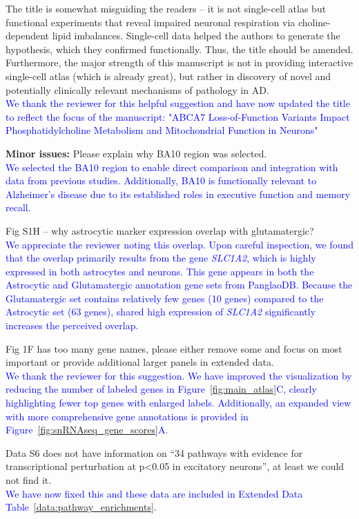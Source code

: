 The title is somewhat misguiding the readers – it is not single-cell atlas but functional experiments that reveal impaired neuronal respiration via choline-dependent lipid imbalances. Single-cell data helped the authors to generate the hypothesis, which they confirmed functionally. Thus, the title should be amended. Furthermore, the major strength of this manuscript is not in providing interactive single-cell atlas (which is already great), but rather in discovery of novel and potentially clinically relevant mechanisms of pathology in AD.\\
\textcolor{blue}{We thank the reviewer for this helpful suggestion and have now updated the title to reflect the focus of the manuscript: "ABCA7 Loss-of-Function Variants Impact Phosphatidylcholine Metabolism and Mitochondrial Function in Neurons"}

\textbf{Minor issues:}
Please explain why BA10 region was selected.\\
\textcolor{blue}{We selected the BA10 region to enable direct comparison and integration with data from previous studies. Additionally, BA10 is functionally relevant to Alzheimer's disease due to its established roles in executive function and memory recall.}

Fig S1H – why astrocytic marker expression overlap with glutamatergic?\\	
\textcolor{blue}{We appreciate the reviewer noting this overlap. Upon careful inspection, we found that the overlap primarily results from the gene \textit{SLC1A2}, which is highly expressed in both astrocytes and neurons. This gene appears in both the Astrocytic and Glutamatergic annotation gene sets from PanglaoDB. Because the Glutamatergic set contains relatively few genes (10 genes) compared to the Astrocytic set (63 genes), shared high expression of \textit{SLC1A2} significantly increases the perceived overlap.}

Fig 1F has too many gene names, please either remove some and focus on most important or provide additional larger panels in extended data.\\
\textcolor{blue}{We thank the reviewer for this suggestion. We have improved the visualization by reducing the number of labeled genes in Figure~\ref{fig:main_atlas}C, clearly highlighting fewer top genes with enlarged labels. Additionally, an expanded view with more comprehensive gene annotations is provided in Figure~\ref{fig:snRNAseq_gene_scores}A.}

Data S6 does not have information on “34 pathways with evidence for transcriptional perturbation at p<0.05 in excitatory neurons”, at least we could not find it.\\
\textcolor{blue}{We have now fixed this and these data are included in Extended Data Table~\ref{data:pathway_enrichments}.}

